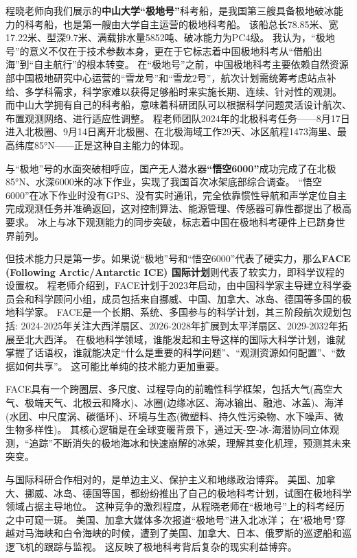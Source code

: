 \documentclass[12pt, a4paper]{article}
\begin{document}
程晓老师向我们展示的\textbf{中山大学“极地号”}科考船，是我国第三艘具备极地破冰能力的科考船，也是第一艘由大学自主运营的极地科考船。
该船总长78.85米、宽17.22米、型深9.7米、满载排水量5852吨、破冰能力为PC4级。
我认为，“极地号”的意义不仅在于技术参数本身，更在于它标志着中国极地科考从“借船出海”到“自主航行”的根本转变。
在“极地号”之前，中国极地科考主要依赖自然资源部中国极地研究中心运营的“雪龙号”和“雪龙2号”，航次计划需统筹考虑站点补给、多学科需求，科学家难以获得足够船时来实施长期、连续、针对性的观测。
而中山大学拥有自己的科考船，意味着科研团队可以根据科学问题灵活设计航次、布置观测网络、进行适应性调整。
程老师团队2024年的北极科考任务——8月17日进入北极圈、9月14日离开北极圈、在北极海域工作29天、冰区航程1473海里、最高纬度85°N——正是这种自主能力的体现。

与“极地”号的水面突破相呼应，国产无人潜水器\textbf{“悟空6000”}成功完成了在北极85°N、水深6000米的冰下作业，实现了我国首次冰架底部综合调查。
“悟空6000”在冰下作业时没有GPS、没有实时通讯，完全依靠惯性导航和声学定位自主完成观测任务并准确返回，这对控制算法、能源管理、传感器可靠性都提出了极高要求。
冰上与冰下观测能力的同步突破，标志着中国在极地科考硬件上已跻身世界前列。

但技术能力只是第一步。如果说“极地”号和“悟空6000”代表了硬实力，那么\textbf{FACE (Following Arctic/Antarctic ICE) 国际计划}则代表了软实力，即科学议程的设置权。
程老师介绍到，FACE计划于2023年启动，由中国科学家主导建立科学委员会和科学顾问小组，成员包括来自挪威、中国、加拿大、冰岛、德国等多国的极地科学家。
FACE是一个长期、系统、多国参与的科学计划，其三阶段航次规划包括: 2024-2025年关注大西洋扇区、2026-2028年扩展到太平洋扇区、2029-2032年拓展至北大西洋。
在极地科学领域，谁能发起和主导这样的国际大科学计划，谁就掌握了话语权，谁就能决定“什么是重要的科学问题”、“观测资源如何配置”、“数据如何共享”。
这可能比单纯的技术能力更加重要。

FACE具有一个跨圈层、多尺度、过程导向的前瞻性科学框架，包括大气(高空大气、极端天气、北极云和降水)、冰圈(边缘冰区、海冰输出、融池、冰盖)、海洋(水团、中尺度涡、碳循环)、环境与生态(微塑料、持久性污染物、水下噪声、微生物多样性)。
其核心逻辑是在全球变暖背景下，通过天-空-冰-海潜协同立体观测，“追踪”不断消失的极地海冰和快速崩解的冰架，理解其变化机理，预测其未来突变。

与国际科研合作相对的，是单边主义、保护主义和地缘政治博弈。
美国、加拿大、挪威、冰岛、德国等国，都纷纷推出了自己的极地科考计划，试图在极地科学领域占据主导地位。
这种竞争的激烈程度，从程晓老师在“极地号”上的科考经历之中可窥一斑。
美国、加拿大媒体多次报道“极地号”进入北冰洋；
在"极地号"穿越对马海峡和白令海峡的时候，遭到了美国、加拿大、日本、俄罗斯的巡逻船和巡逻飞机的跟踪与监视。
这反映了极地科考背后复杂的现实利益博弈。
\end{document}
